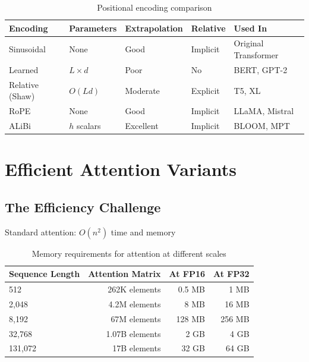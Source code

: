 \begin{table}[H]
\centering
\caption{Positional encoding comparison}
\begin{tabularx}{\textwidth}{lXXXX}
\toprule
\textbf{Encoding} & \textbf{Parameters} & \textbf{Extrapolation} & \textbf{Relative} & \textbf{Used In} \\
\midrule
Sinusoidal & None & Good & Implicit & Original Transformer \\
Learned & $L \times d$ & Poor & No & BERT, GPT-2 \\
Relative (Shaw) & $O(Ld)$ & Moderate & Explicit & T5, XL \\
RoPE & None & Good & Implicit & LLaMA, Mistral \\
ALiBi & $h$ scalars & Excellent & Implicit & BLOOM, MPT \\
\bottomrule
\end{tabularx}
\end{table}

\section{Efficient Attention Variants}
\label{sec:efficient_attention}

\subsection{The Efficiency Challenge}

Standard attention: $O(n^2)$ time and memory

\begin{table}[H]
\centering
\caption{Memory requirements for attention at different scales}
\begin{tabular}{lrrr}
\toprule
\textbf{Sequence Length} & \textbf{Attention Matrix} & \textbf{At FP16} & \textbf{At FP32} \\
\midrule
512 & 262K elements & 0.5 MB & 1 MB \\
2,048 & 4.2M elements & 8 MB & 16 MB \\
8,192 & 67M elements & 128 MB & 256 MB \\
32,768 & 1.07B elements & 2 GB & 4 GB \\
131,072 & 17B elements & 32 GB & 64 GB \\
\bottomrule
\end{tabular}
\end{table}

